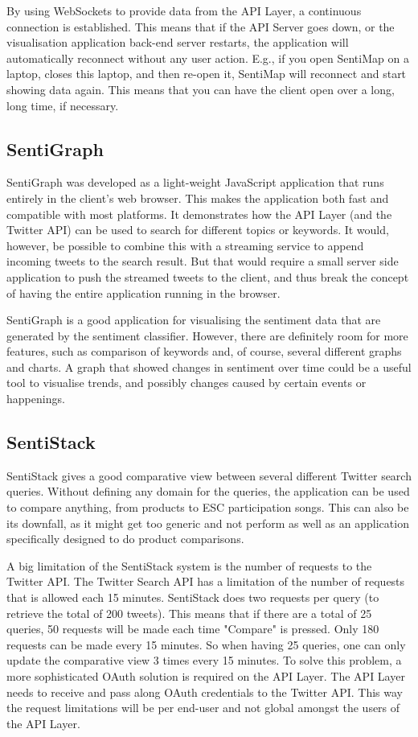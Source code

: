 By using WebSockets to provide data from the API Layer, a continuous connection is established. This means that if the API Server goes down, or the visualisation application back-end server restarts, the application will automatically reconnect without any user action. E.g., if you open SentiMap on a laptop, closes this laptop, and then re-open it, SentiMap will reconnect and start showing data again. This means that you can have the client open over a long, long time, if necessary.   

\subsection{SentiGraph}
SentiGraph was developed as a light-weight JavaScript application that runs entirely in the client's web browser. This makes the application both fast and compatible with most platforms. It demonstrates how the API Layer (and the Twitter API) can be used to search for different topics or keywords. It would, however, be possible to combine this with a streaming service to append incoming tweets to the search result. But that would require a small server side application to push the streamed tweets to the client, and thus break the concept of having the entire application running in the browser.

SentiGraph is a good application for visualising the sentiment data that are generated by the sentiment classifier. However, there are definitely room for more features, such as comparison of keywords and, of course, several different graphs and charts. A graph that showed changes in sentiment over time could be a useful tool to visualise trends, and possibly changes caused by certain events or happenings. 

\subsection{SentiStack}

SentiStack gives a good comparative view between several different Twitter search queries. Without defining any domain for the queries, the application can be used to compare anything, from products to ESC participation songs. This can also be its downfall, as it might get too generic and not perform as well as an application specifically designed to do product comparisons. 

A big limitation of the SentiStack system is the number of requests to the Twitter API. The Twitter Search API has a limitation of the number of requests that is allowed each 15 minutes. SentiStack does two requests per query (to retrieve the total of 200 tweets). This means that if there are a total of 25 queries, 50 requests will be made each time "Compare" is pressed. Only 180 requests can be made every 15 minutes. So when having 25 queries, one can only update the comparative view 3 times every 15 minutes. To solve this problem, a more sophisticated OAuth solution is required on the API Layer. The API Layer needs to receive and pass along OAuth credentials to the Twitter API. This way the request limitations will be per end-user and not global amongst the users of the API Layer.


